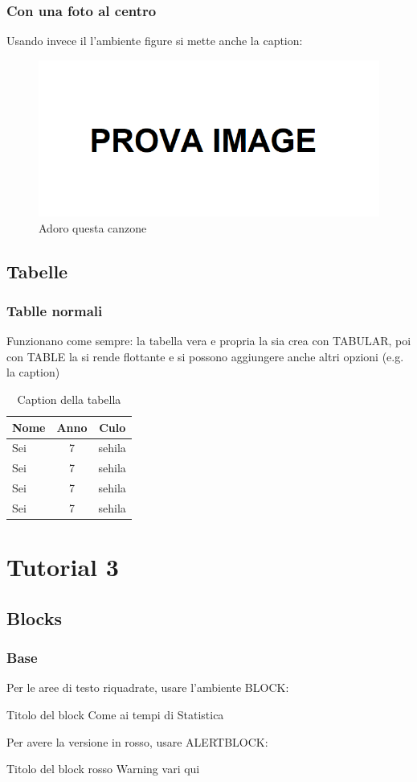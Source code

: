 \documentclass{beamer}[10]
\begin{document}
	\begin{frame}
		\frametitle{Con una foto al centro}
		Usando invece il l'ambiente figure si mette anche la caption:
		\begin{figure}
			\includegraphics[scale=0.2]{prova}
			\caption{Adoro questa canzone}
		\end{figure}
	\end{frame}
	
	\subsection{Tabelle}
	\begin{frame}
		\frametitle{Tablle normali}
		Funzionano come sempre: la tabella vera e propria la sia crea con TABULAR, poi con TABLE la si rende flottante e si possono aggiungere anche altri opzioni (e.g. la caption)
		\begin{table}
			\begin{tabular}{lcc}
				\toprule
				Nome & Anno & Culo \\
				\midrule
				Sei & 7 & sehila \\
				Sei & 7 & sehila \\
				Sei & 7 & sehila \\
				Sei & 7 & sehila \\
				\bottomrule
			\end{tabular}
			\caption{Caption della tabella}
		\end{table}
	\end{frame}
	
	\section{Tutorial 3}
	
	\subsection{Blocks}
	\begin{frame}
		\frametitle{Base}
		Per le aree di testo riquadrate, usare l'ambiente BLOCK:
		\begin{block}{Titolo del block}
			Come ai tempi di Statistica
		\end{block}
		Per avere la versione in rosso, usare ALERTBLOCK:
		\begin{alertblock}{Titolo del block rosso}
			Warning vari qui
		\end{alertblock}
	\end{frame}
	
\end{document}
